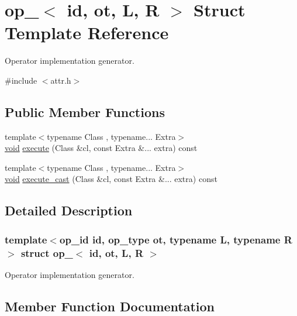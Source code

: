 \hypertarget{structop__}{}\section{op\+\_\+$<$ id, ot, L, R $>$ Struct Template Reference}
\label{structop__}


Operator implementation generator.  




{\ttfamily \#include $<$attr.\+h$>$}

\subsection*{Public Member Functions}
\begin{DoxyCompactItemize}
\item 
{\footnotesize template$<$typename Class , typename... Extra$>$ }\\\mbox{\hyperlink{_s_d_l__opengles2__gl2ext_8h_ae5d8fa23ad07c48bb609509eae494c95}{void}} \mbox{\hyperlink{structop___aa92b55350b41ce2bceacbd41a19102cc}{execute}} (Class \&cl, const Extra \&... extra) const
\item 
{\footnotesize template$<$typename Class , typename... Extra$>$ }\\\mbox{\hyperlink{_s_d_l__opengles2__gl2ext_8h_ae5d8fa23ad07c48bb609509eae494c95}{void}} \mbox{\hyperlink{structop___a558b286aee467524017f0dac59bb4abf}{execute\+\_\+cast}} (Class \&cl, const Extra \&... extra) const
\end{DoxyCompactItemize}


\subsection{Detailed Description}
\subsubsection*{template$<$op\+\_\+id id, op\+\_\+type ot, typename L, typename R$>$\newline
struct op\+\_\+$<$ id, ot, L, R $>$}

Operator implementation generator. 

\subsection{Member Function Documentation}
\mbox{\label{structop___aa92b55350b41ce2bceacbd41a19102cc}} 
